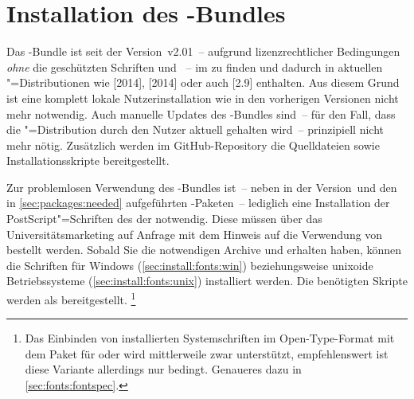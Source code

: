 \section{Installation des \TUDScript-Bundles}
\label{sec:install}%
%
%
%
%
Das \TUDScript-Bundle ist seit der Version~v2.01~-- aufgrund lizenzrechtlicher 
Bedingungen \emph{ohne} die geschützten Schriften \Univers und \DIN~-- im 
\foreignlanguage{english}{%
} zu finden und dadurch in aktuellen "=Distributionen wie 
[2014], [2014] 
oder auch [2.9] enthalten. Aus diesem Grund ist 
eine komplett lokale Nutzerinstallation wie in den vorherigen Versionen nicht 
mehr notwendig. Auch manuelle Updates des \TUDScript-Bundles sind~-- für den 
Fall, dass die "=Distribution durch den Nutzer aktuell gehalten 
wird~-- prinzipiell nicht mehr nötig. Zusätzlich werden im GitHub-Repository 
 die Quelldateien 
sowie Installationsskripte bereitgestellt.

Zur problemlosen Verwendung des \TUDScript-Bundles ist~-- neben \KOMAScript{} in
der Version~\vKOMAScript und den in \autoref{sec:packages:needed} aufgeführten 
-Paketen~-- lediglich eine Installation der PostScript"=Schriften 
des \CDs der \TnUD notwendig. Diese müssen über das Universitätsmarketing auf 
%
{Anfrage} mit dem Hinweis auf die Verwendung von  bestellt 
werden. Sobald Sie die notwendigen Archive  und 
 erhalten haben, können die Schriften für Windows 
(\autoref{sec:install:fonts:win}) beziehungsweise unixoide Betriebssysteme 
(\autoref{sec:install:fonts:unix}) installiert werden. Die benötigten Skripte 
werden als  
bereitgestellt.%
\footnote{%
  Das Einbinden von installierten Systemschriften im Open-Type-Format mit dem 
  Paket  für  oder  wird 
  mittlerweile zwar unterstützt, empfehlenswert ist diese Variante allerdings 
  nur bedingt. Genaueres dazu in \autoref{sec:fonts:fontspec}.%
}


